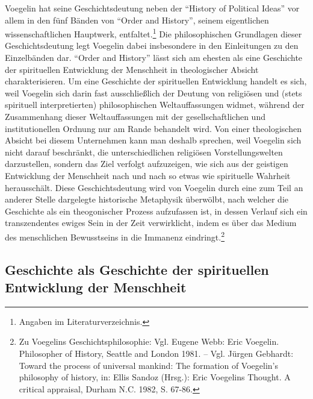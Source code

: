Voegelin hat seine Geschichtsdeutung neben der "`History of Political Ideas"'
vor allem in den fünf Bänden von "`Order and History"', seinem eigentlichen
wissenschaftlichen Hauptwerk, entfaltet.\footnote{Angaben im
  Literaturverzeichnis.} Die philosophischen Grundlagen dieser
Geschichtsdeutung legt Voegelin dabei insbesondere in den Einleitungen zu den
Einzelbänden dar.  "`Order and History"' lässt sich am ehesten als eine
Geschichte der spirituellen Entwicklung der Menschheit in theologischer
Absicht charakterisieren. Um eine Geschichte der spirituellen Entwicklung
handelt es sich, weil Voegelin sich darin fast ausschließlich der Deutung von
religiösen und (stets spirituell interpretierten) philosophischen
Weltauf\/fassungen widmet, während der Zusammenhang dieser Weltauf\/fassungen
mit der gesellschaftlichen und institutionellen Ordnung nur am Rande behandelt
wird.  Von einer theologischen Absicht bei diesem Unternehmen kann man deshalb
sprechen, weil Voegelin sich nicht darauf beschränkt, die unterschiedlichen
religiösen Vorstellungswelten darzustellen, sondern das Ziel verfolgt
aufzuzeigen, wie sich aus der geistigen Entwicklung der Menschheit nach und
nach so etwas wie spirituelle Wahrheit herausschält. Diese Geschichtsdeutung
wird von Voegelin durch eine zum Teil an anderer Stelle dargelegte historische
Metaphysik überwölbt, nach welcher die Geschichte als ein theogonischer Prozess
aufzufassen ist, in dessen Verlauf sich ein transzendentes ewiges Sein in der
Zeit verwirklicht, indem es über das Medium des menschlichen Bewusstseins in
die Immanenz eindringt.\footnote{Zu Voegelins Geschichtsphilosophie: Vgl.
  Eugene Webb: Eric Voegelin. Philosopher of History, Seattle and London 1981.
  -- Vgl.  Jürgen Gebhardt: Toward the process of universal mankind: The
  formation of Voegelin's philosophy of history, in: Ellis Sandoz (Hrsg.):
  Eric Voegelins Thought. A critical appraisal, Durham N.C. 1982, S. 67-86.}

\subsection{Geschichte als Geschichte der spirituellen Entwicklung der Menschheit}

